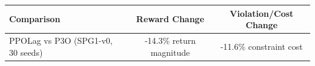\footnotesize
\setlength{\tabcolsep}{6pt}
\begin{tabular}{lcc}
\toprule
Comparison & Reward Change & Violation/Cost Change \\
\midrule
PPOLag vs P3O (SPG1-v0, 30 seeds) & -14.3\% return magnitude & -11.6\% constraint cost \\
\bottomrule
\end{tabular}
